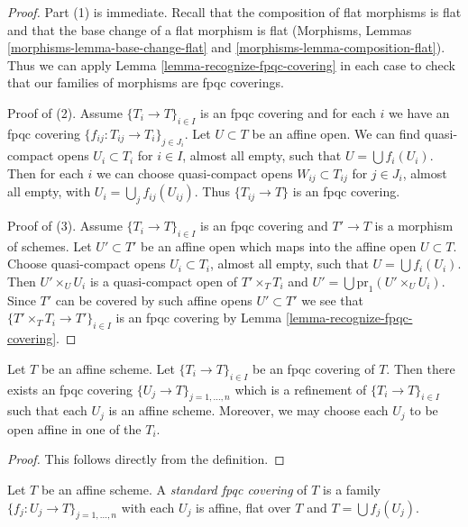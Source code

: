 \begin{proof}
Part (1) is immediate. Recall that the composition of flat morphisms
is flat and that the base change of a flat morphism is flat
(Morphisms, Lemmas \ref{morphisms-lemma-base-change-flat} and
\ref{morphisms-lemma-composition-flat}).
Thus we can apply Lemma \ref{lemma-recognize-fpqc-covering}
in each case to check that our families of morphisms are fpqc coverings.

\medskip\noindent
Proof of (2). Assume $\{T_i \to T\}_{i\in I}$ is an fpqc covering and for each
$i$ we have an fpqc covering $\{f_{ij} : T_{ij} \to T_i\}_{j\in J_i}$.
Let $U \subset T$ be an affine open. We can find
quasi-compact opens $U_i \subset T_i$ for $i \in I$, almost all empty,
such that $U = \bigcup f_i(U_i)$. Then for each $i$ we can choose
quasi-compact opens $W_{ij} \subset T_{ij}$ for $j \in J_i$, almost all empty,
with $U_i = \bigcup_j f_{ij}(U_{ij})$. Thus
$\{T_{ij} \to T\}$ is an fpqc covering.

\medskip\noindent
Proof of (3). Assume $\{T_i \to T\}_{i\in I}$ is an fpqc covering
and $T' \to T$ is a morphism of schemes. Let $U' \subset T'$ be an affine
open which maps into the affine open $U \subset T$. Choose
quasi-compact opens $U_i \subset T_i$, almost all empty,
such that $U = \bigcup f_i(U_i)$. Then $U' \times_U U_i$ is
a quasi-compact open of $T' \times_T T_i$ and
$U' = \bigcup \text{pr}_1(U' \times_U U_i)$. Since $T'$
can be covered by such affine opens $U' \subset T'$ we see
that $\{T' \times_T T_i \to T'\}_{i\in I}$ is an fpqc covering by
Lemma \ref{lemma-recognize-fpqc-covering}.
\end{proof}

\begin{lemma}
\label{lemma-fpqc-affine}
Let $T$ be an affine scheme.
Let $\{T_i \to T\}_{i \in I}$ be an fpqc covering of $T$.
Then there exists an fpqc covering
$\{U_j \to T\}_{j = 1, \ldots, n}$ which is a refinement
of $\{T_i \to T\}_{i \in I}$ such that each $U_j$ is an affine
scheme. Moreover, we may choose each $U_j$ to be open affine
in one of the $T_i$.
\end{lemma}

\begin{proof}
This follows directly from the definition.
\end{proof}

\begin{definition}
\label{definition-standard-fpqc}
Let $T$ be an affine scheme. A {\it standard fpqc covering}
of $T$ is a family $\{f_j : U_j \to T\}_{j = 1, \ldots, n}$
with each $U_j$ is affine, flat over $T$ and $T = \bigcup f_j(U_j)$.
\end{definition}

